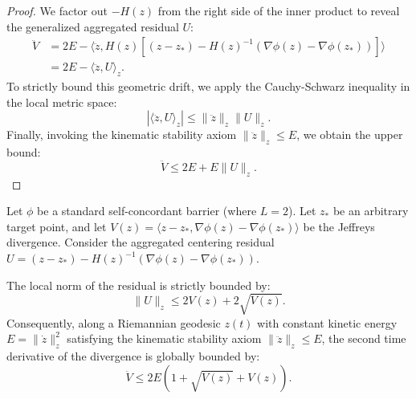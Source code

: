 \begin{proof}
We factor out $-H(z)$ from the right side of the inner product to reveal the generalized aggregated residual $U$:
\begin{align}
    \ddot{V} &= 2E - \langle \ddot{z}, H(z) \left[ (z - z_*) - H(z)^{-1}(\nabla \phi(z) - \nabla \phi(z_*)) \right] \rangle \nonumber \\
             &= 2E - \langle \ddot{z}, U \rangle_z.
\end{align}
To strictly bound this geometric drift, we apply the Cauchy-Schwarz inequality in the local metric space:
\begin{equation}
    | \langle \ddot{z}, U \rangle_z | \le \|\ddot{z}\|_z \|U\|_z.
\end{equation}
Finally, invoking the kinematic stability axiom $\|\ddot{z}\|_z \le E$, we obtain the upper bound:
\begin{equation}
    \ddot{V} \le 2E + E \|U\|_z.
\end{equation}
\end{proof}


\begin{lemma}
\label{lem:residual_and_drift}
Let $\phi$ be a standard self-concordant barrier (where $L=2$). Let $z_*$ be an arbitrary target point, and let $V(z) = \langle z - z_*, \nabla \phi(z) - \nabla \phi(z_*) \rangle$ be the Jeffreys divergence. Consider the aggregated centering residual $U = (z - z_*) - H(z)^{-1}(\nabla \phi(z) - \nabla \phi(z_*))$.

The local norm of the residual is strictly bounded by:
\begin{equation}
    \|U\|_z \le 2V(z) + 2\sqrt{V(z)}.
\end{equation}
Consequently, along a Riemannian geodesic $z(t)$ with constant kinetic energy $E = \|\dot{z}\|_z^2$ satisfying the kinematic stability axiom $\|\ddot{z}\|_z \le E$, the second time derivative of the divergence is globally bounded by:
\begin{equation}
    \ddot{V} \le 2E \left( 1 + \sqrt{V(z)} + V(z) \right).
\end{equation}
\end{lemma}

